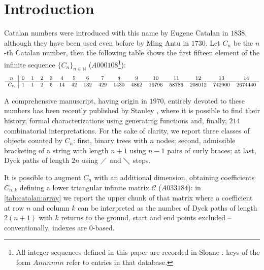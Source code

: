 
\section{Introduction}

\noindent Catalan numbers were introduced with this name by
Eugene Catalan in $1838$, although they have been used even before by Ming Antu
in $1730$. Let $C_{n}$ be the $n$-th Catalan number, then the following
table shows the first fifteen element of the infinite sequence 
$\lbrace C_{n}\rbrace_{n\in\mathbb{N}}$ ($A000108$\footnote{All integer sequences
defined in this paper are recorded in Sloane \cite{sloane:oeis}: keys of
the form $Annnnnn$ refer to entries in that database.}):
\begin{displaymath}
    \footnotesize
    \begin{array}{c|ccccccccccccccc}
        n & 0 & 1 & 2 & 3 & 4 & 5 & 6 & 7 & 8 & 9 & 10 & 11 & 12 & 13 & 14 \\
        \hline
        C_{n} & 1 & 1 & 2 & 5 & 14 & 42 & 132 & 429 & 1430 & 4862 & 16796 & 58786 & 208012 & 742900 & 2674440
    \end{array}
\end{displaymath}

A comprehensive manuscript, having origin in $1970$, entirely devoted to these numbers has been recently
published by Stanley \cite{stanley:2015}, where it is possible to find their history,
formal characterizations using generating functions and, finally, $214$ combinatorial 
interpretations.  For the sake of clarity, we report three classes of objects counted by 
$C_{n}$: first, binary trees with $n$ nodes; 
second, admissible bracketing of a string with length $n+1$ using $n-1$ pairs
of curly braces; at last, Dyck paths of length $2n$ using $\diagup$ and $\diagdown$ steps.

It is possible to augment $C_{n}$ with an additional dimension,
obtaining coefficients $C_{n,k}$ defining a lower triangular infinite 
matrix $\mathcal{C}$ ($A033184$): in \autoref{tab:catalan:array} 
we report the upper chunk of that matrix where a coefficient at row $n$ 
and column $k$ can be interpreted as the number
of Dyck paths of length $2(n+1)$ with $k$ returns to the ground, start
and end points excluded -- conventionally, indexes are $0$-based.



